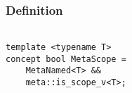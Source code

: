 
\subsubsection{Definition}

\begin{verbatim}

template <typename T>
concept bool MetaScope =
	MetaNamed<T> &&
	meta::is_scope_v<T>;

\end{verbatim}
